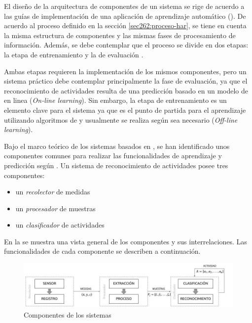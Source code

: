 \label{sec42:componentes}El diseño de la arquitectura de componentes
de un sistema  se rige de acuerdo a las guías de implementación
de una aplicación de aprendizaje automático (). De acuerdo
al proceso definido en la sección \ref{sec262:proceso-har}, se tiene
en cuenta la misma estructura de componentes y las mismas fases de
procesamiento de información. Además, se debe contemplar que el proceso
se divide en dos etapas: la etapa de entrenamiento y la de evaluación
\cite{LaraLabrador2013}. 

Ambas etapas requieren la implementación de los mismos componentes,
pero un sistema  práctico debe contemplar principalmente
la fase de evaluación, ya que el reconocimiento de actividades resulta
de una predicción basado en un modelo de  en linea (\emph{On-line
learning}). Sin embargo, la etapa de entrenamiento es un elemento
clave para el sistema ya que es el punto de partida para el aprendizaje
utilizando algoritmos de  y usualmente se realiza según
sea necesario (\emph{Off-line learning}).

Bajo el marco teórico de los sistemas  basados en ,
se han identificado unos componentes comunes para realizar las funcionalidades
de aprendizaje y predicción según \cite{Choudhury2008}. Un sistema
de reconocimiento de actividades posee tres componentes:
\begin{itemize}
\item un \emph{recolector }de medidas
\item un\emph{ procesador }de muestras 
\item un \emph{clasificador }de actividades
\end{itemize}
En la  se muestra una vista general
de los componentes y sus interrelaciones. Las funcionalidades de cada
componente se describen a continuación. 

\begin{figure}[!tbph]
\centering{}\includegraphics[width=1\columnwidth,width=1\linewidth]{capitulo-4/graphics/diagrama_4_1}\caption[Componentes ]{\label{fig4:componentes-har}Componentes de los sistemas }
\end{figure}


